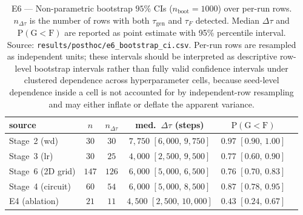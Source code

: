 \documentclass{article}
\newcommand{\taug}{\tau_{\mathrm{gen}}}
\newcommand{\tauf}{\tau_{F}}
\newcommand{\Dtau}{\Delta\tau}
\begin{document}
\begin{table}[tbp]
  \centering
  \caption{E6 --- Non-parametric bootstrap $95\%$ CIs
    ($n_{\mathrm{boot}}{=}1000$) over per-run rows.
    $n_{\Dtau}$ is the number of rows with both $\taug$ and
    $\tauf$ detected.
    Median $\Dtau$ and $\mathrm{P}(\mathrm{G}{<}\mathrm{F})$ are
    reported as point estimate with 95\% percentile interval.
    Source: \texttt{results/posthoc/e6\_bootstrap\_ci.csv}.
    Per-run rows are resampled as independent units; these
    intervals should be interpreted as descriptive row-level
    bootstrap intervals rather than fully valid confidence
    intervals under clustered dependence across hyperparameter
    cells, because seed-level dependence inside a cell is not
    accounted for by independent-row resampling and may either
    inflate or deflate the apparent variance.}
  \label{tab:e6_bootstrap}
  \small
  \begin{tabular}{lccccc}
    \toprule
    source & $n$ & $n_{\Dtau}$ & med.\ $\Dtau$ (steps) &
    $\mathrm{P}(\mathrm{G}{<}\mathrm{F})$ \\
    \midrule
    Stage~2 (wd)       & $30$  & $30$  & $7{,}750$ $[6{,}000,\,9{,}750]$   & $0.97$ $[0.90,\,1.00]$ \\
    Stage~3 (lr)       & $30$  & $25$  & $4{,}000$ $[2{,}500,\,9{,}500]$   & $0.77$ $[0.60,\,0.90]$ \\
    Stage~6 (2D grid)  & $147$ & $126$ & $6{,}000$ $[5{,}000,\,6{,}500]$   & $0.76$ $[0.70,\,0.83]$ \\
    Stage~4 (circuit)  & $60$  & $54$  & $6{,}000$ $[5{,}000,\,8{,}500]$   & $0.87$ $[0.78,\,0.95]$ \\
    E4 (ablation)      & $21$  & $11$  & $4{,}500$ $[2{,}500,\,10{,}000]$  & $0.43$ $[0.24,\,0.67]$ \\
    \bottomrule
  \end{tabular}
\end{table}
\end{document}
